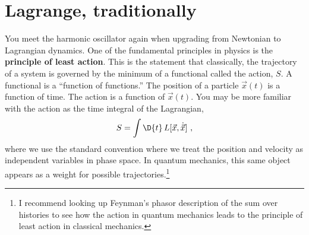 \section{Lagrange, traditionally}
\label{sec:lagrange:spring:theory}

You meet the harmonic oscillator again when upgrading from Newtonian to Lagrangian dynamics. 
% 
One of the fundamental principles in physics is the \textbf{principle of least action}. This is the statement that classically, the trajectory of a system is governed by the minimum of a functional called the action, $S$. A functional is a ``function of functions.'' The position of a particle $\vec{x}(t)$ is a function of time. The action is a function of $\vec{x}(t)$. You may be more familiar with the action as the time integral of the Lagrangian,
\begin{align}
    S = \int \D{t}\, L[\vec{x}, \dot{\vec{x}}] \ ,
\end{align}
where we use the standard convention where we treat the position and velocity as independent variables in phase space. In quantum mechanics, this same object appears as a weight for possible trajectories.\footnote{I recommend looking up Feynman's phasor description of the sum over histories to see how the action in quantum mechanics leads to the principle of least action in classical mechanics.}


